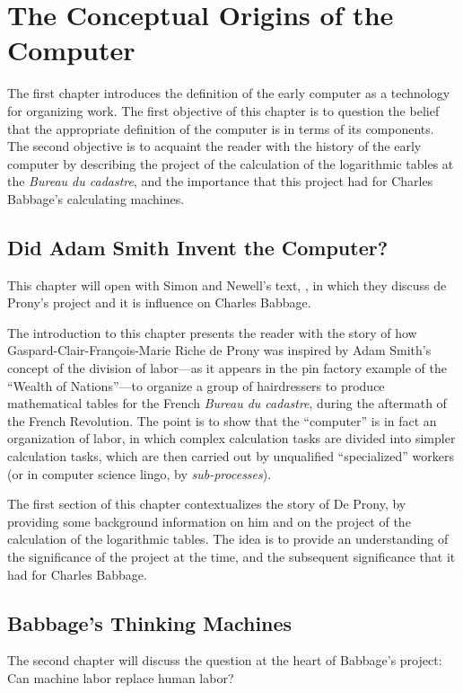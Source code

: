 \documentclass[version=last,draft=false,paper=A4,portrait,twoside=true,twocolumn=true,headinclude=false,footinclude=false,fontsize=12,BCOR=20mm,DIV=13,pagesize=auto,titlepage=firstiscover,mpinclude=false,open=right,chapterprefix=true,numbers=autoendperiod,headsepline=false,parskip=false]{scrbook}
\begin{document}
\chapter{The Conceptual Origins of the Computer}
\label{sec:org2a83b13}
The first chapter introduces the definition of the early computer as a
technology for organizing work. The first objective of this chapter is to
question the belief that the appropriate definition of the computer is in
terms of its components. The second objective is to acquaint the reader
with the history of the early computer by describing the project of the
calculation of the logarithmic tables at the \emph{Bureau du cadastre}, and the
importance that this project had for Charles Babbage's calculating
machines.
\section{Did Adam Smith Invent the Computer?}
\label{sec:org46c2453}
This chapter will open with Simon and Newell's text,
, in which they discuss de Prony's project and it
is influence on Charles Babbage.

The introduction to this chapter presents the reader with the story of how
Gaspard-Clair-François-Marie Riche de Prony was inspired by Adam Smith's
concept of the division of labor---as it appears in the pin factory example
of the ``Wealth of Nations''---to organize a group of hairdressers to
produce mathematical tables for the French \emph{Bureau du cadastre}, during the
aftermath of the French Revolution. The point is to show that the
``computer'' is in fact an organization of labor, in which complex
calculation tasks are divided into simpler calculation tasks, which are
then carried out by unqualified ``specialized'' workers (or in computer
science lingo, by \emph{sub-processes}).

The first section of this chapter contextualizes the story of De Prony, by
providing some background information on him and on the project of the
calculation of the logarithmic tables. The idea is to provide an
understanding of the significance of the project at the time, and the
subsequent significance that it had for Charles Babbage.

\section{Babbage's Thinking Machines}
\label{sec:org53fa496}

The second chapter will discuss the question at the heart of Babbage's
project: Can machine labor replace human labor?
\end{document}
